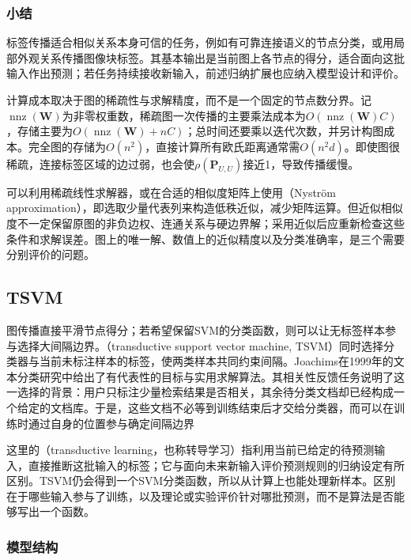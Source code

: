 \subsubsection{小结}
\label{sec:classification-label-propagation-summary}

标签传播适合相似关系本身可信的任务，例如有可靠连接语义的节点分类，或用局部外观关系传播图像块标签。其基本输出是当前图上各节点的得分，适合面向这批输入作出预测；若任务持续接收新输入，前述归纳扩展也应纳入模型设计和评价。

计算成本取决于图的稀疏性与求解精度，而不是一个固定的节点数分界。记$\operatorname{nnz}(\bm{W})$为非零权重数，稀疏图一次传播的主要乘法成本为$O(\operatorname{nnz}(\bm{W})C)$，存储主要为$O(\operatorname{nnz}(\bm{W})+nC)$；总时间还要乘以迭代次数，并另计构图成本。完全图的存储为$O(n^2)$，直接计算所有欧氏距离通常需$O(n^2d)$。即使图很稀疏，连接标签区域的边过弱，也会使$\rho(\bm{P}_{U,U})$接近1，导致传播缓慢。

可以利用稀疏线性求解器，或在合适的相似度矩阵上使用（Nyström approximation），即选取少量代表列来构造低秩近似，减少矩阵运算。但近似相似度不一定保留原图的非负边权、连通关系与硬边界解；采用近似后应重新检查这些条件和求解误差。图上的唯一解、数值上的近似精度以及分类准确率，是三个需要分别评价的问题。

\subsection{TSVM}
\label{sec:classification-tsvm}

图传播直接平滑节点得分；若希望保留SVM的分类函数，则可以让无标签样本参与选择大间隔边界。（transductive support vector machine, TSVM）同时选择分类器与当前未标注样本的标签，使两类样本共同约束间隔。Joachims在1999年的文本分类研究中给出了有代表性的目标与实用求解算法。其相关性反馈任务说明了这一选择的背景：用户只标注少量检索结果是否相关，其余待分类文档却已经构成一个给定的文档库。于是，这些文档不必等到训练结束后才交给分类器，而可以在训练时通过自身的位置参与确定间隔边界

这里的（transductive learning，也称转导学习）指利用当前已给定的待预测输入，直接推断这批输入的标签；它与面向未来新输入评价预测规则的归纳设定有所区别。TSVM仍会得到一个SVM分类函数，所以从计算上也能处理新样本。区别在于哪些输入参与了训练，以及理论或实验评价针对哪批预测，而不是算法是否能够写出一个函数。

\subsubsection{模型结构}
\label{sec:classification-tsvm-structure}

